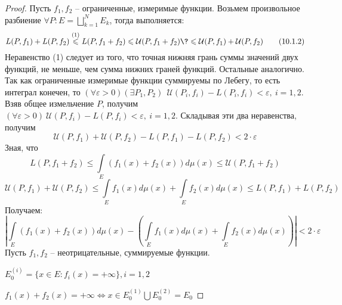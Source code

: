 \begin{proof}
 Пусть $f_1, f_2$ -- ограниченные, измеримые функции. Возьмем произвольное разбиение $\forall P: E=\bigsqcup\limits_{k=1}^N E_k$, тогда выполняется:
 \begin{equation}
 	L(P,f_1)+L(P,f_2)\overset{(1)}{\leqslant} L(P, f_1+f_2) \leqslant \mathcal{U}(P, f_1+f_2) \? \leqslant \mathcal{U}(P, f_1)+\mathcal{U}(P, f_2) \tag{10.1.2}\label{10.1.2} 
\end{equation}
Неравенство (1) следует из того, что точная нижняя грань суммы значений двух функций, не меньше, чем сумма нижних граней функций. Остальные аналогично. Так как ограниченные измеримые функции суммируемы по Лебегу, то есть интеграл конечен, то $(\forall \varepsilon >0)(\exists P_1, P_2)\ \ \mathcal{U}(P_i, f_i)-L(P_i, f_i)<\varepsilon,\ i = 1,2.$ Взяв общее измельчение $P$, получим $(\forall \varepsilon >0)\ \mathcal{U}(P, f_i)-L(P, f_i)<\varepsilon,\ i = 1,2.$ Складывая эти два неравенства, получим $$\mathcal{U}(P, f_1)+\mathcal{U}(P, f_2)-L(P,f_1)-L(P,f_2)<2\cdot\varepsilon$$
Зная, что 
$$L(P, f_1+f_2) \leqslant \int\limits_E(f_1(x)+f_2(x))d\mu(x) \leqslant \mathcal{U}(P, f_1+f_2)$$ 
$$\mathcal{U}(P, f_1)+\mathcal{U}(P, f_2)\leqslant \int\limits_Ef_1(x)d\mu(x)+\int\limits_E f_2(x)d\mu(x) \leqslant L(P,f_1)+L(P,f_2)$$
Получаем:
$$\left|\int\limits_E(f_1(x)+f_2(x))d\mu(x)-\left(\int\limits_Ef_1(x)d\mu(x)+\int\limits_E f_2(x)d\mu(x)\right)\right|<2\cdot\varepsilon$$
Пусть $f_1, f_2$ -- неотрицательные, суммируемые функции.
 
$E_0^{(i)} = \{x\in E: f_i(x)=+\infty\}, i = 1,2$

$f_1(x)+f_2(x)=+\infty \Leftrightarrow x\in E_0^{(1)}\bigcup E_0^{(2)} = E_0$
\end{proof}

 

































